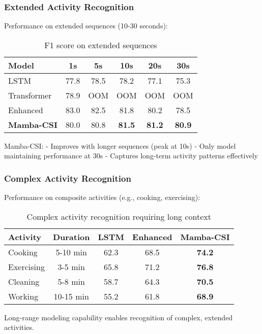 \documentclass[10pt,journal,compsoc]{IEEEtran}
\begin{document}
\subsubsection{Extended Activity Recognition}

Performance on extended sequences (10-30 seconds):

\begin{table}[h]
\centering
\caption{F1 score on extended sequences}
\label{tab:long_sequence}
\begin{tabular}{lccccc}
\toprule
Model & 1s & 5s & 10s & 20s & 30s \\
\midrule
LSTM & 77.8 & 78.5 & 78.2 & 77.1 & 75.3 \\
Transformer & 78.9 & OOM & OOM & OOM & OOM \\
Enhanced & 83.0 & 82.5 & 81.8 & 80.2 & 78.5 \\
\textbf{Mamba-CSI} & 80.0 & 80.8 & \textbf{81.5} & \textbf{81.2} & \textbf{80.9} \\
\bottomrule
\end{tabular}
\end{table}

Mamba-CSI:
- Improves with longer sequences (peak at 10s)
- Only model maintaining performance at 30s
- Captures long-term activity patterns effectively

\subsubsection{Complex Activity Recognition}

Performance on composite activities (e.g., cooking, exercising):

\begin{table}[h]
\centering
\caption{Complex activity recognition requiring long context}
\label{tab:complex_activities}
\begin{tabular}{lcccc}
\toprule
Activity & Duration & LSTM & Enhanced & Mamba-CSI \\
\midrule
Cooking & 5-10 min & 62.3 & 68.5 & \textbf{74.2} \\
Exercising & 3-5 min & 65.8 & 71.2 & \textbf{76.8} \\
Cleaning & 5-8 min & 58.7 & 64.3 & \textbf{70.5} \\
Working & 10-15 min & 55.2 & 61.8 & \textbf{68.9} \\
\bottomrule
\end{tabular}
\end{table}

Long-range modeling capability enables recognition of complex, extended activities.
\end{document}
